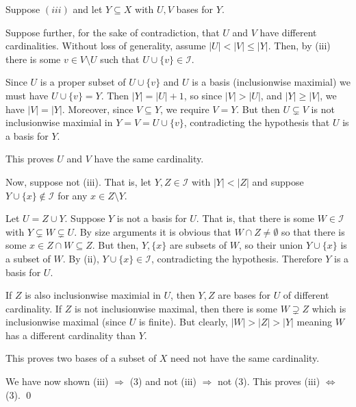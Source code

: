 \documentclass[10pt]{article}
\begin{document}
\begin{solution}[Solution]
Suppose \( (iii) \) and let \( Y\subseteq X \) with \( U,V \) bases for \( Y \). 

Suppose further, for the sake of contradiction, that \( U \) and \( V \) have different cardinalities. Without loss of generality, assume \( |U|<|V|\leq |Y| \). Then, by (iii) there is some \( v\in V\setminus U \) such that \( U\cup\{v\}\in\mathcal{I} \).

Since \( U \) is a proper subset of \( U\cup\{v\} \) and \( U \) is a basis (inclusionwise maximial) we must have \( U\cup\{v\} = Y \). Then \( |Y| = |U|+1 \), so since \( |V|>|U| \), and \( |Y|\geq|V| \), we have \( |V|=|Y| \). Moreover, since \( V\subseteq Y \), we require \( V=Y \). But then \( U \subsetneq V \) is not inclusionwise maximial in \( Y=V=U\cup\{v\} \), contradicting the hypothesis that \( U \) is a basis for \( Y \).

This proves \( U \) and \( V \) have the same cardinality.

Now, suppose not (iii). That is, let \( Y,Z\in\mathcal{I} \) with \( |Y|<|Z| \) and suppose \( Y\cup\{x\} \notin\mathcal{I} \) for any \( x\in Z\setminus Y \).

Let \( U = Z\cup Y \). Suppose \( Y \) is not a basis for \( U \). That is, that there is some \( W\in\mathcal{I} \) with \( Y\subsetneq W\subsetneq U  \). By size arguments it is obvious that \( W\cap Z \neq \emptyset \) so that there is some \( x\in Z\cap W \subseteq Z \). But then, \( Y,\{x\} \) are subsets of \( W \), so their union \( Y\cup\{x\} \) is a subset of \(  W \). By (ii), \( Y\cup\{x\}\in \mathcal{I} \), contradicting the hypothesis. Therefore \( Y \) is a basis for \( U \).


If \( Z \) is also inclusionwise maximial in \( U \), then \( Y,Z \) are bases for \( U \) of different cardinality. If \( Z \) is not inclusionwise maximal, then there is some \( W\supsetneq Z \) which is inclusionwise maximal (since \( U \) is finite). But clearly, \( |W|>|Z|>|Y| \) meaning \( W \) has a different cardinality than \( Y \).

This proves two bases of a subset of \( X \) need not have the same cardinality.

We have now shown (iii) \( \Longrightarrow \) (3) and not (iii) \( \Longrightarrow \) not (3). This proves (iii) \( \Longleftrightarrow \) (3). \qed
\end{solution}
\end{document}
